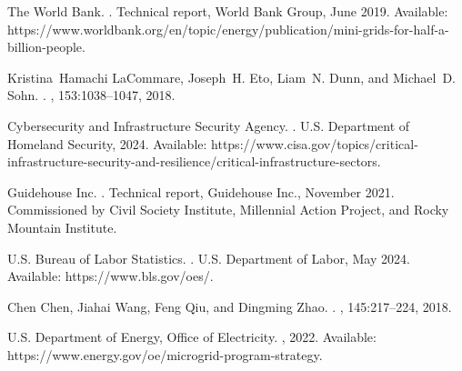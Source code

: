 \documentclass[12pt]{article}
\begin{document}
\begin{thebibliography}{10}
{The World Bank}.
.
\newblock Technical report, World Bank Group, June 2019.
\newblock Available:
  https://www.worldbank.org/en/topic/energy/publication/mini-grids-for-half-a-billion-people.

Kristina~Hamachi LaCommare, Joseph~H. Eto, Liam~N. Dunn, and Michael~D. Sohn.
.
, 153:1038--1047, 2018.

{Cybersecurity and Infrastructure Security Agency}.
.
\newblock U.S. Department of Homeland Security, 2024.
\newblock Available:
  https://www.cisa.gov/topics/critical-infrastructure-security-and-resilience/critical-infrastructure-sectors.

{Guidehouse Inc.}
.
\newblock Technical report, Guidehouse Inc., November 2021.
\newblock Commissioned by Civil Society Institute, Millennial Action Project,
  and Rocky Mountain Institute.

{U.S. Bureau of Labor Statistics}.
.
\newblock U.S. Department of Labor, May 2024.
\newblock Available: https://www.bls.gov/oes/.

Chen Chen, Jiahai Wang, Feng Qiu, and Dingming Zhao.
.
, 145:217--224, 2018.

{U.S. Department of Energy, Office of Electricity}.
, 2022.
\newblock Available: https://www.energy.gov/oe/microgrid-program-strategy.

\end{thebibliography}
\end{document}
